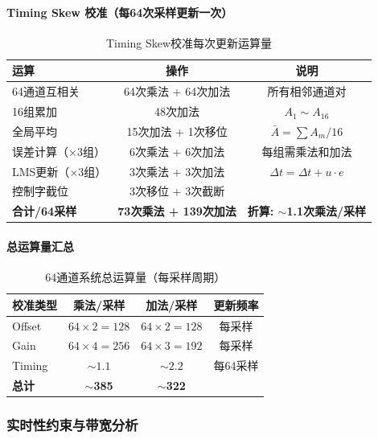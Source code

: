 \documentclass[UTF8,a4paper,11pt]{ctexart}
\begin{document}
\paragraph{Timing Skew 校准（每64次采样更新一次）}

\begin{table}[ht]
\centering
\caption{Timing Skew校准每次更新运算量}
\begin{tabular}{lcc}
\toprule
\textbf{运算} & \textbf{操作} & \textbf{说明} \\
\midrule
64通道互相关 & 64次乘法 + 64次加法 & 所有相邻通道对 \\
16组累加 & 48次加法 & $A_1 \sim A_{16}$ \\
全局平均 & 15次加法 + 1次移位 & $\bar{A} = \sum A_m / 16$ \\
误差计算（$\times$3组） & 6次乘法 + 6次加法 & 每组需乘法和加法 \\
LMS更新（$\times$3组） & 3次乘法 + 3次加法 & $\Delta t = \Delta t + u \cdot e$ \\
控制字截位 & 3次移位 + 3次截断 & \\
\midrule
\textbf{合计/64采样} & \textbf{73次乘法 + 139次加法} & \textbf{折算: $\sim$1.1次乘法/采样} \\
\bottomrule
\end{tabular}
\end{table}

\paragraph{总运算量汇总}

\begin{table}[ht]
\centering
\caption{64通道系统总运算量（每采样周期）}
\begin{tabular}{lccc}
\toprule
\textbf{校准类型} & \textbf{乘法/采样} & \textbf{加法/采样} & \textbf{更新频率} \\
\midrule
Offset  & $64 \times 2 = 128$ & $64 \times 2 = 128$ & 每采样 \\
Gain    & $64 \times 4 = 256$ & $64 \times 3 = 192$ & 每采样 \\
Timing  & $\sim 1.1$ & $\sim 2.2$ & 每64采样 \\
\midrule
\textbf{总计} & \textbf{$\sim$385} & \textbf{$\sim$322} & \\
\bottomrule
\end{tabular}
\end{table}

\subsubsection{实时性约束与带宽分析}
\end{document}
